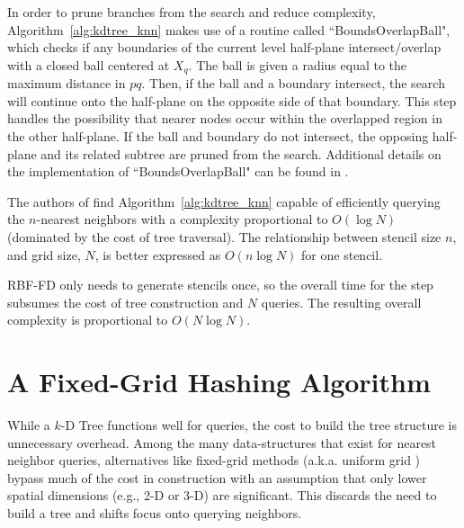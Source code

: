 \documentclass{report}
\begin{document}
In order to prune branches from the search and reduce complexity, Algorithm~\ref{alg:kdtree_knn} makes use of a routine called ``BoundsOverlapBall", which checks if any boundaries of the current level half-plane intersect/overlap with a closed ball centered at $X_q$. The ball is given a radius equal to the maximum distance in $pq$. Then, if the ball and a boundary intersect, the search will continue onto the half-plane on the opposite side of that boundary. This step handles the possibility that nearer nodes occur within the overlapped region in the other half-plane. If the ball and boundary do not intersect, the opposing half-plane and its related subtree are pruned from the search. Additional details on the implementation of ``BoundsOverlapBall" can be found in \cite{Friedman1977,TagliasacchiGC}. 

The authors of \cite{Friedman1977} find Algorithm~\ref{alg:kdtree_knn} capable of efficiently querying the $n$-nearest neighbors with a complexity proportional to $O(\log{N})$ (dominated by the cost of tree traversal). The relationship between stencil size $n$, and grid size, $N$, is better expressed as $O(n \log{N})$ for one stencil. 

RBF-FD only needs to generate stencils once, so the overall time for the step subsumes the cost of tree construction and $N$ queries. The resulting overall complexity is proportional to $O(N\log{N})$. %





\section{A Fixed-Grid Hashing Algorithm}

While a $k$-D Tree functions well for queries, the cost to build the tree structure is unnecessary overhead. Among the many data-structures that exist for nearest neighbor queries, alternatives like fixed-grid methods \cite{Samet2005,Wendland2002,WendlandBook} (a.k.a. uniform grid \cite{Krog2010,Green2010}) bypass much of the cost in construction with an assumption that only lower spatial dimensions (e.g., 2-D or 3-D) are significant. This discards the need to build a tree and shifts focus onto querying neighbors. 
\end{document}
